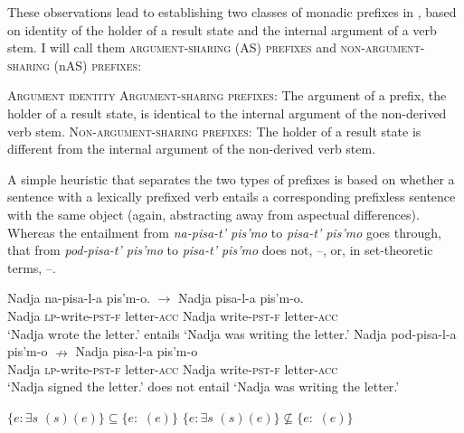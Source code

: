 \documentclass[output=paper,colorlinks,citecolor=brown]{langscibook}
\begin{document}
These observations lead to establishing two classes of monadic prefixes in , based on identity of the holder of a result state and the internal argument of a verb stem. I will call them \textsc{argument-sharing} (AS) \textsc{prefixes} and \textsc{non-argument-sharing} (nAS) \textsc{prefixes}:

\eanoraggedright   \textsc{Argument identity}\label{ex:tatevosov:77}
\eanoraggedright \textsc{Argument-sharing prefixes}: The argument of a prefix, the holder of a result state, is identical to the  internal argument of the non-derived verb stem.
  \ex   \textsc{Non-argument-sharing prefixes}: The holder of a result state is different from the internal argument of the non-derived verb stem.
\z
\z

\largerpage
\noindent A simple heuristic that separates the two types of prefixes is based on whether a sentence with a lexically prefixed verb entails a corresponding prefixless sentence with the same object (again, abstracting away from aspectual differences). Whereas the entailment from \textit{na-pisa-t’ pis’mo} to \textit{pisa-t’ pis’mo} goes through, that from \textit{pod-pisa-t’ pis’mo} to \textit{pisa-t’ pis’mo} does not, --, or, in set-theoretic terms, --.

\ea\label{ex:tatevosov:78}
\ea\label{ex:tatevosov:78a}
\gll    Nadja na-pisa-l-a pis’m-o. $\rightarrow$ Nadja pisa-l-a pis’m-o. \\
      Nadja \textsc{lp}-write-\textsc{pst-f}  letter-\textsc{acc}   {}   Nadja write-\textsc{pst-f}  letter-\textsc{acc}\\
\glt  ‘Nadja wrote the letter.’   entails   ‘Nadja was writing the letter.’
\ex\label{ex:tatevosov:78b}
\gll    Nadja   pod-pisa-l-a   pis’m-o   $\nrightarrow $    Nadja   pisa-l-a   pis’m-o \\
Nadja \textsc{lp}-write-\textsc{pst-f}  letter-\textsc{acc}  {}    Nadja write-\textsc{pst-f}  letter-\textsc{acc}\\
\glt     ‘Nadja signed the letter.’  does not entail    ‘Nadja was writing the letter.’
\z
\z

\ea\label{ex:tatevosov:79}
\ea   $\{e: \exists s$ $(s)(e)\} \subseteq \{e:$ $(e) \}$\label{ex:tatevosov:79a}
\ex    $\{e: \exists s$ $(s)(e)\} \nsubseteq \{e:$ $(e) \}$\label{ex:tatevosov:79b}
\z
\z
\end{document}
